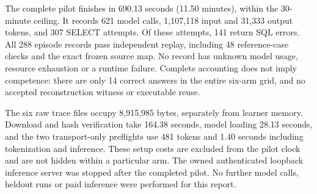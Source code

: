 The complete pilot finishes in 690.13 seconds (11.50 minutes), within the
30-minute ceiling. It records 621 model calls, 1,107,118 input and 31,333 output
tokens, and 307 SELECT attempts. Of these attempts, 141 return SQL errors.
All 288 episode records pass independent replay, including 48 reference-case
checks and the exact frozen source map. No record has unknown model usage,
resource exhaustion or a runtime failure. Complete accounting does not imply
competence: there are only 14 correct answers in the entire six-arm grid,
and no accepted reconstruction witness or executable reuse.

The six raw trace files occupy 8,915,985 bytes, separately from learner memory.
Download and hash verification take 164.38 seconds, model loading 28.13 seconds,
and the two transport-only preflights use 481 tokens and 1.40 seconds including
tokenization and inference. These setup costs are excluded from the pilot clock
and are not hidden within a particular arm. The owned authenticated loopback
inference server was stopped after the completed pilot. No further model calls,
heldout runs or paid inference were performed for this report.
